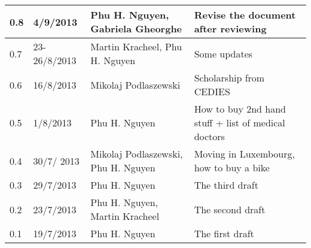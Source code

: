 \begin{center}
\begin{table*}[t!]
\begin{tabular}{ | l | l | p{3cm} | p{6cm} |}
  0.8 & 4/9/2013 & Phu H. Nguyen, Gabriela Gheorghe & Revise the document after reviewing \\  \hline
  0.7 & 23-26/8/2013 & Martin Kracheel, Phu H. Nguyen & Some updates \\  \hline
  0.6 & 16/8/2013 & Mikolaj Podlaszewski & Scholarship from CEDIES \\  \hline
  0.5 & 1/8/2013 & Phu H. Nguyen & How to buy 2nd hand stuff + list of medical doctors \\  \hline
  0.4 & 30/7/ 2013 & Mikolaj Podlaszewski, Phu H. Nguyen & Moving in Luxembourg, how to buy a bike \\  \hline
  0.3 & 29/7/2013 & Phu H. Nguyen & The third draft \\    \hline
  0.2 & 23/7/2013 & Phu H. Nguyen, Martin Kracheel & The second draft \\  \hline
  0.1 & 19/7/2013 & Phu H. Nguyen & The first draft \\ \hline
	\end{tabular}
	\label{tab:Revisions}

\end{table*}
\end{center}
